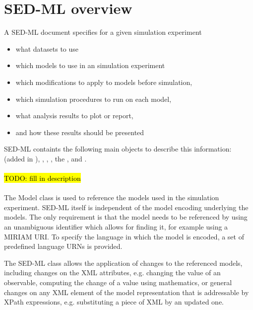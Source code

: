 \section{SED-ML overview}
A SED-ML document specifies for a given simulation experiment

\begin{itemize}
\item what datasets to use
\item which models to use in an simulation experiment
\item which modifications to apply to models before simulation,
\item which simulation procedures to run on each model,
\item what analysis results to plot or report,
\item and how these results should be presented
\end{itemize}

SED-ML containts the following main objects to describe this information:  (added in \LoneVthree), , , , the , and .

\paragraph*{}
\hl{TODO: fill in description}

\paragraph*{}
The Model class is used to reference the models used in the simulation experiment. SED-ML itself is independent of the model encoding underlying the models. The only requirement is that the model needs to be referenced by using an unambiguous identifier which allows for finding it, for example using a MIRIAM URI. To specify the language in which the model is encoded, a set of predefined language URNs is provided.

The SED-ML  class allows the application of changes to the referenced models, including changes on the XML attributes, e.g. changing the value of an observable, computing the change of a value using mathematics, or general changes on any XML element of the model representation that is addressable by XPath expressions, e.g. substituting a piece of XML by an updated one.

